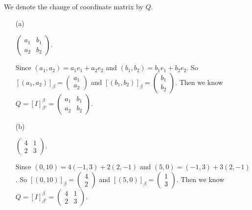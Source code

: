 \begin{Exercise}
We denote the change of coordinate matrix by $Q$.
\begin{enumerate}[(a)]
\item[(a)]
\begin{answer}
$\begin{pmatrix}
a_1 & b_1 \\
a_2 & b_2
\end{pmatrix}$.
\end{answer}
\begin{solution}
Since $(a_1, a_2) = a_1 e_1 + a_2 e_2$ and $(b_1, b_2) = b_1 e_1 + b_2 e_2$. So $[(a_1,a_2)]_{\beta} = \begin{pmatrix} a_1 \\
a_2
\end{pmatrix}$ and $[(b_1,b_2)]_{\beta} = \begin{pmatrix} b_1 \\
b_2
\end{pmatrix}$. Then we know $Q = [I]_{\beta'}^{\beta} = \begin{pmatrix}
a_1 & b_1 \\
a_2 & b_2
\end{pmatrix}$.
\end{solution}

\item[(b)]
\begin{answer}
$\begin{pmatrix}
4 & 1 \\
2 & 3
\end{pmatrix}$.
\end{answer}
\begin{solution}
Since $(0,10) = 4(-1,3)+2(2,-1)$ and $(5,0) = (-1,3)+3(2,-1)$. So $[(0,10)]_{\beta} = \begin{pmatrix}
4 \\
2
\end{pmatrix}$ and $[(5,0)]_{\beta} = \begin{pmatrix} 
1 \\
3
\end{pmatrix}$. Then we know $Q = [I]_{\beta'}^{\beta} = \begin{pmatrix}
4 & 1 \\
2 & 3
\end{pmatrix}$.
\end{solution}


\end{enumerate}
\end{Exercise}

